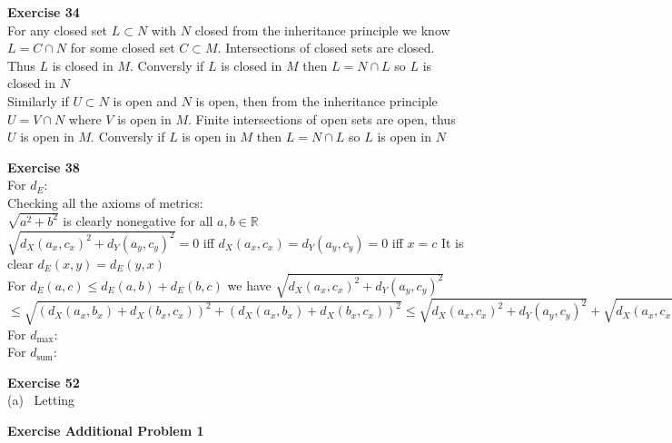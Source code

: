 \documentclass[12pt]{article}
\newenvironment{ques}[1]{\textbf{Exercise #1}\vspace{1 mm}\\ }{\bigskip}
\theoremstyle{definition}
\newcommand{\R}{\mathbb R}
\begin{document}
\begin{ques}{34}
	For any closed set $L \subset N$ with $N$ closed from the inheritance
	principle we know $L = C \cap N$ for some closed set $C \subset M$.
	Intersections of closed sets are closed. Thus $L$ is closed in $M$.
	Conversly if $L$ is closed in $M$ then $L = N \cap L$ so $L$ is closed in
	$N$\\
	Similarly if $U \subset N$ is open and $N$ is open,  then from the
	inheritance principle $U = V \cap N$ where $V$ is open in $M$. Finite
	intersections of open sets are open, thus $U$ is open in $M$.
	Conversly if $L$ is open in $M$ then $L = N \cap L$ so $L$ is open in
	$N$
\end{ques}

\begin{ques}{38}
	For $d_E$:  \\
	Checking all the axioms of metrics:\\
	$\sqrt{a^2 + b^2}$ is clearly nonegative for all $a,b \in \R$\\
	$\sqrt{d_X(a_x,c_x)^2 + d_Y(a_y,c_y)^2} = 0$ iff $d_X(a_x,c_x) =
	d_Y(a_y,c_y) = 0$ iff $x = c$
	It is clear $d_E(x,y) = d_E(y,x)$\\
	For $d_E(a, c) \leq d_E(a,b) + d_E(b,c)$ we have $\sqrt{d_X(a_x,c_x)^2 +
	d_Y(a_y,c_y)^2}$\\ 
	$\leq \sqrt{(d_X(a_x,b_x) + d_X(b_x,c_x))^2 +
	(d_X(a_x,b_x) + d_X(b_x,c_x))^2} \leq \sqrt{d_X(a_x,c_x)^2 + d_Y(a_y,c_y)^2} +
	\sqrt{d_X(a_x,c_x)^2 + d_Y(a_y,c_y)^2}$ \\ 
	For $d_\text{max}$:\\

	For $d_\text{sum}$:\\

\end{ques}

\begin{ques}{52}
	(a) \ Letting 
\end{ques}

\begin{ques}{Additional Problem 1}
	
\end{ques}
\end{document}
